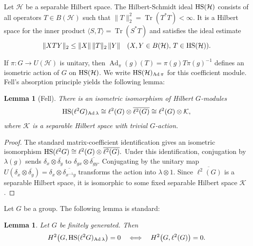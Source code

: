 \documentclass[12pt]{amsproc}
\theoremstyle{plain}
\newtheorem{lemma}[theorem]{Lemma}
\theoremstyle{definition}
\numberwithin{equation}{section}
\newcommand{\HS}{{\rm HS}}
\newcommand{\BH}{B(\mathcal H)}
\newcommand{\La}{\lambda}
\newcommand{\ol}[1]{\overline{#1}}
\DeclareMathOperator{\Ad}{Ad}
\begin{document}
Let $\mathcal H$ be a separable Hilbert space. The Hilbert-Schmidt ideal $\HS(\mathcal H)$ consists of all operators $T\in \BH$ such that
$
\|T\|_2^2=\operatorname{Tr}(T^*T)<\infty.
$
It is a Hilbert space for the inner product $\langle S,T\rangle=\operatorname{Tr}(S^*T)$ and satisfies the ideal estimate
\[
\|XTY\|_2\le \|X\|\,\|T\|_2\,\|Y\| \quad (X,Y\in \BH,\,T\in \HS(\mathcal H)).
\]

If $\pi\colon G\to U(\mathcal H)$ is unitary, then
$
\Ad_\pi(g)(T)=\pi(g)T\pi(g)^{-1}
$
defines an isometric action of $G$ on $\HS(\mathcal H)$. We write $\HS(\mathcal H)_{\Ad\pi}$ for this coefficient module. Fell's absorption principle yields the following lemma:

\begin{lemma}[Fell]\label{lem:HSdecomp}
There is an isometric isomorphism of Hilbert $G$-modules
\[
\HS(\ell^2 G)_{\Ad\La}\cong \ell^2(G)\otimes \ol{\ell^2(G)}\cong \ell^2(G)\otimes \mathcal K,
\]
where $\mathcal K$ is a separable Hilbert space with trivial $G$-action.
\end{lemma}

\begin{proof}
The standard matrix-coefficient identification gives an isometric isomorphism
$
\HS(\ell^2 G)\cong \ell^2(G)\otimes \ol{\ell^2(G)}.
$
Under this identification, conjugation by $\La(g)$ sends $\delta_x\otimes \ol{\delta_y}$ to $\delta_{gx}\otimes \ol{\delta_{gy}}$. Conjugating by the unitary map
$
U(\delta_x\otimes \ol{\delta_y})=\delta_{x}\otimes \ol{\delta_{x^{-1}y}}
$
transforms the action into $\La\otimes 1$. Since $\ol{\ell^2(G)}$ is a separable Hilbert space, it is isomorphic to some fixed separable Hilbert space $\mathcal K$.
\end{proof}
Let $G$ be a group.
The following lemma is standard:

\begin{lemma}\label{lem:transfer}
Let $G$ be finitely generated. Then
\[
H^2\bigl(G,\HS(\ell^2 G)_{\Ad\La}\bigr)=0
\quad\Longleftrightarrow\quad
H^2\bigl(G,\ell^2(G)\bigr)=0.
\]
\end{lemma}
\end{document}
